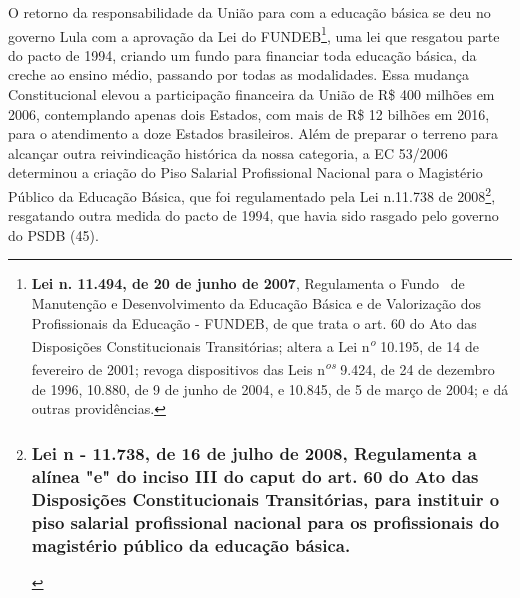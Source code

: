O retorno da responsabilidade da União para com a educação básica se deu
no governo Lula com a aprovação da Lei do FUNDEB\footnote{\textbf{Lei n.
  11.494, de 20 de junho de 2007}, Regulamenta o Fundo~ de Manutenção e
  Desenvolvimento da Educação Básica e de Valorização dos Profissionais
  da Educação - FUNDEB, de que trata o art. 60 do Ato das Disposições
  Constitucionais Transitórias; altera a Lei n\textsuperscript{\emph{o}}
  10.195, de 14 de fevereiro de 2001; revoga dispositivos das Leis
  n\textsuperscript{\emph{os}} 9.424, de 24 de dezembro de 1996, 10.880,
  de 9 de junho de 2004, e 10.845, de 5 de março de 2004; e dá outras
  providências.}, uma lei que resgatou parte do pacto de 1994, criando
um fundo para financiar toda educação básica, da creche ao ensino médio,
passando por todas as modalidades. Essa mudança Constitucional elevou a
participação financeira da União de R\$ 400 milhões em 2006,
contemplando apenas dois Estados, com mais de R\$ 12 bilhões em 2016,
para o atendimento a doze Estados brasileiros. Além de preparar o
terreno para alcançar outra reivindicação histórica da nossa categoria,
a EC 53/2006 determinou a criação do Piso Salarial Profissional Nacional
para o Magistério Público da Educação Básica, que foi regulamentado pela
Lei n.11.738 de 2008\footnote{\subsubsection{ Lei n - 11.738, de 16 de
  julho de 2008, Regulamenta a alínea "e" do inciso III do caput do art.
  60 do Ato das Disposições Constitucionais Transitórias, para instituir
  o piso salarial profissional nacional para os profissionais do
  magistério público da educação
  básica.}\label{lei-n---11.738-de-16-de-julho-de-2008-regulamenta-a-aluxednea-e-do-inciso-iii-do-caput-do-art.-60-do-ato-das-disposiuxe7uxf5es-constitucionais-transituxf3rias-para-instituir-o-piso-salarial-profissional-nacional-para-os-profissionais-do-magistuxe9rio-puxfablico-da-educauxe7uxe3o-buxe1sica.}},
resgatando outra medida do pacto de 1994, que havia sido rasgado pelo
governo do PSDB (45).

